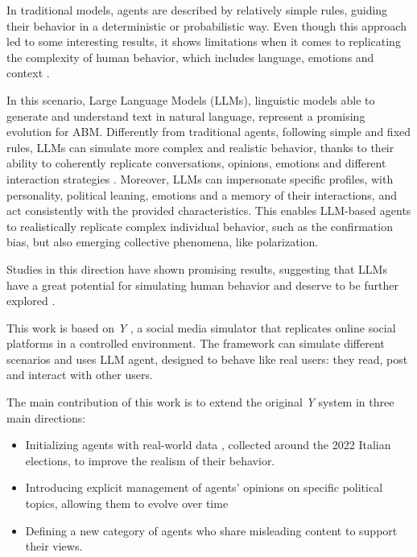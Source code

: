In traditional models, agents are described by relatively simple rules, guiding their behavior in a deterministic or probabilistic way.
Even though this approach led to some interesting results, it shows limitations when it comes to replicating the complexity of human behavior, which includes language, emotions and context \cite{conte2014agent, törnberg2023evaluate}.

In this scenario, Large Language Models (LLMs), linguistic models able to generate and understand text in natural language, represent a promising evolution for ABM.
Differently from traditional agents, following simple and fixed rules, LLMs can simulate more complex and realistic behavior, thanks to their ability to coherently replicate conversations, opinions, emotions and different interaction strategies \cite{park2023genagents}.
Moreover, LLMs can impersonate specific profiles, with personality, political leaning, emotions and a memory of their interactions, and act consistently with the provided characteristics.
This enables LLM-based agents to realistically replicate complex individual behavior, such as the confirmation bias, but also emerging collective phenomena, like polarization.

Studies in this direction have shown promising results, suggesting that LLMs have a great potential for simulating human behavior and deserve to be further explored \cite{gao2023s3socialnetworksimulationlarge, törnberg2023evaluate, rossetti2024ysocialllmpoweredsocial}.


\medskip
This work is based on \textit{Y} \cite{rossetti2024ysocialllmpoweredsocial}, a social media simulator that replicates online social platforms in a controlled environment.
The framework can simulate different scenarios and uses LLM agent, designed to behave like real users: they read, post and interact with other users.

The main contribution of this work is to extend the original \textit{Y} system in three main directions:
\begin{itemize}
    \item Initializing agents with real-world data \cite{pierri2023ita}, collected around the 2022 Italian elections, to improve the realism of their behavior.
    \item Introducing explicit management of agents' opinions on specific political topics, allowing them to evolve over time
    \item Defining a new category of agents who share misleading content to support their views.
\end{itemize}

